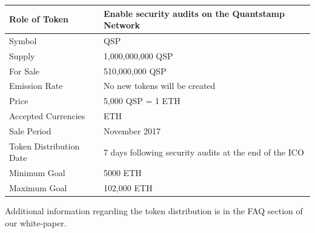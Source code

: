 \documentclass[final,smallcondensed]{llncs}
\begin{document}
\begin{table}[h!]
\begin{tabular}{|l|l|}
\hline
Role of Token           & Enable security audits on the Quantstamp Network       \\ \hline
Symbol                  & QSP                                                    \\ \hline
Supply                  & 1,000,000,000 QSP                                      \\ \hline
For Sale                & 510,000,000 QSP                                        \\ \hline
Emission Rate           & No new tokens will be created                          \\ \hline
Price                   & 5,000 QSP = 1 ETH                                      \\ \hline
Accepted Currencies     & ETH                                                    \\ \hline
Sale Period             & November 2017                                          \\ \hline
Token Distribution Date & 7 days following security audits at the end of the ICO \\ \hline
Minimum Goal            & 5000 ETH                                               \\ \hline
Maximum Goal            & 102,000 ETH                                            \\ \hline
\end{tabular}
\end{table}

\noindent Additional information regarding the token distribution is in the FAQ section of our white-paper.
\end{document}
